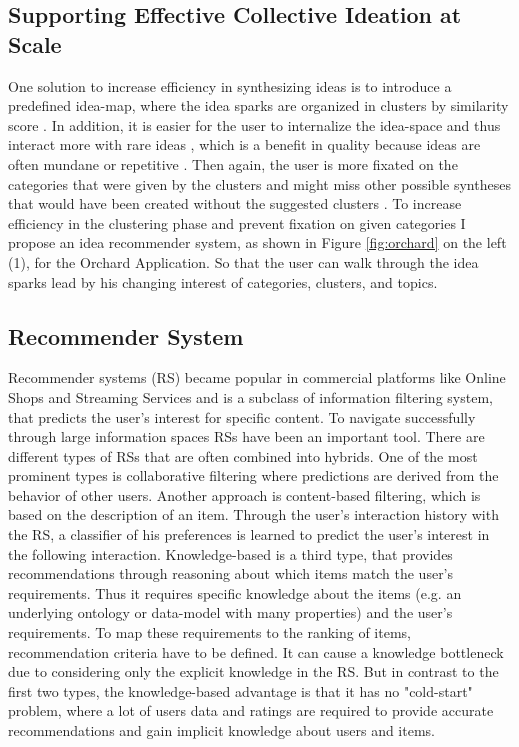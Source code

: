 \documentclass[pdftex,a4paper,12pt]{scrartcl}
\theoremstyle{definition}
\begin{document}
\subsection{Supporting Effective Collective Ideation at Scale}
    One solution to increase efficiency in synthesizing ideas is to introduce a predefined idea-map, where the idea sparks are organized in clusters by similarity score \citep[124]{siangliulue_supporting_2017}. In addition, it is easier for the user to internalize the idea-space and thus interact more with rare ideas \citep{siangliulue_supporting_2017}, which is a benefit in quality because ideas are often mundane or repetitive \citep{siangliulue_ideahound:_2016}. Then again, the user is more fixated on the categories that were given by the clusters and might miss other possible syntheses that would have been created without the suggested clusters \citep{siangliulue_supporting_2017}. To increase efficiency in the clustering phase and prevent fixation on given categories I propose an idea recommender system, as shown in Figure \ref{fig:orchard} on the left (1), for the Orchard Application. So that the user can walk through the idea sparks lead by his changing interest of categories, clusters, and topics. 
    
\subsection{Recommender System}
Recommender systems (RS) became popular in commercial platforms like Online Shops and Streaming Services and is a subclass of information filtering system, that predicts the user's interest for specific content. To navigate successfully through large information spaces RSs have been an important tool. There are different types of RSs that are often combined into hybrids. One of the most prominent types is collaborative filtering where predictions are derived from the behavior of other users. Another approach is content-based filtering, which is based on the description of an item. Through the user's interaction history with the RS, a classifier of his preferences is learned to predict the user's interest in the following interaction. 
Knowledge-based is a third type, that provides recommendations through reasoning about which items match the user's requirements. Thus it requires specific knowledge about the items (e.g. an underlying ontology or data-model with many properties) and the user's requirements. To map these requirements to the ranking of items, recommendation criteria have to be defined. It can cause a knowledge bottleneck due to considering only the explicit knowledge in the RS.
But in contrast to the first two types, the knowledge-based advantage is that it has no "cold-start" problem, where a lot of users data and ratings are required to provide accurate recommendations and gain implicit knowledge about users and items. 
\end{document}
